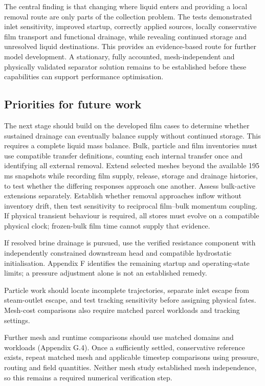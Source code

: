 The central finding is that changing where liquid enters and providing a local removal route are only parts of the collection problem. The tests demonstrated inlet sensitivity, improved startup, correctly applied sources, locally conservative film transport and functional drainage, while revealing continued storage and unresolved liquid destinations. This provides an evidence-based route for further model development. A stationary, fully accounted, mesh-independent and physically validated separator solution remains to be established before these capabilities can support performance optimisation.

\subsection{Priorities for future work}

The next stage should build on the developed film cases to determine whether sustained drainage can eventually balance supply without continued storage. This requires a complete liquid mass balance. Bulk, particle and film inventories must use compatible transfer definitions, counting each internal transfer once and identifying all external removal. Extend selected meshes beyond the available 195 ms snapshots while recording film supply, release, storage and drainage histories, to test whether the differing responses approach one another. Assess bulk-active extensions separately. Establish whether removal approaches inflow without inventory drift, then test sensitivity to reciprocal film--bulk momentum coupling. If physical transient behaviour is required, all stores must evolve on a compatible physical clock; frozen-bulk film time cannot supply that evidence.

If resolved brine drainage is pursued, use the verified resistance component with independently constrained downstream head and compatible hydrostatic initialisation. Appendix F identifies the remaining startup and operating-state limits; a pressure adjustment alone is not an established remedy.

Particle work should locate incomplete trajectories, separate inlet escape from steam-outlet escape, and test tracking sensitivity before assigning physical fates. Mesh-cost comparisons also require matched parcel workloads and tracking settings.

Further mesh and runtime comparisons should use matched domains and workloads (Appendix G.4). Once a sufficiently settled, conservative reference exists, repeat matched mesh and applicable timestep comparisons using pressure, routing and field quantities. Neither mesh study established mesh independence, so this remains a required numerical verification step.

